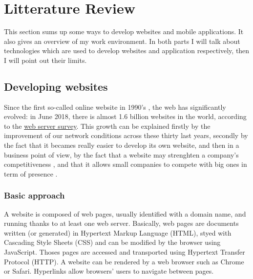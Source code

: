 \documentclass{article}
\begin{document}
        \newpage
        \section{Litterature Review}
            This section sums up some ways to develop websites and mobile applications. It also gives an overview of
            my work environment.
            In both parts I will talk about technologies which are used to develop websites and application respectively,
            then I will point out their limits.
                \subsection{Developing websites}
                    Since the first so-called online website in 1990's \cite{history}, the web has significantly evolved: in June 2018, there is
                    almost 1.6 billion websites in the world, according to the \href{https://news.netcraft.com/archives/2018/06/13/june-2018-web-server-survey.html}{web server survey}.
                    This growth can be explained firstly by the improvement of our network conditions across these thirty last years, secondly by the fact that it 
                    becames really easier to develop its own website, and then in a business point of view,
                    by the fact that a website may strenghten a company's competitiveness \cite{compet}, and
                    that it allows small companies to compete with big ones in term of presence \cite{presence}.
                    \subsubsection{Basic approach}
                        A website is composed of web pages, usually identified with a domain name, and running thanks to
                        at least one web server. Basically, web pages are documents written (or generated) in Hypertext 
                        Markup Language (HTML), styed with Cascading Style Sheets (CSS) and can be modified by the browser using JavaScript. 
                        Thoses pages are accessed and transported using Hypertext Transfer Protocol (HTTP).
                        A website can be rendered by a web browser such as Chrome or Safari. Hyperlinks allow browsers' users to
                        navigate between pages.
\end{document}
